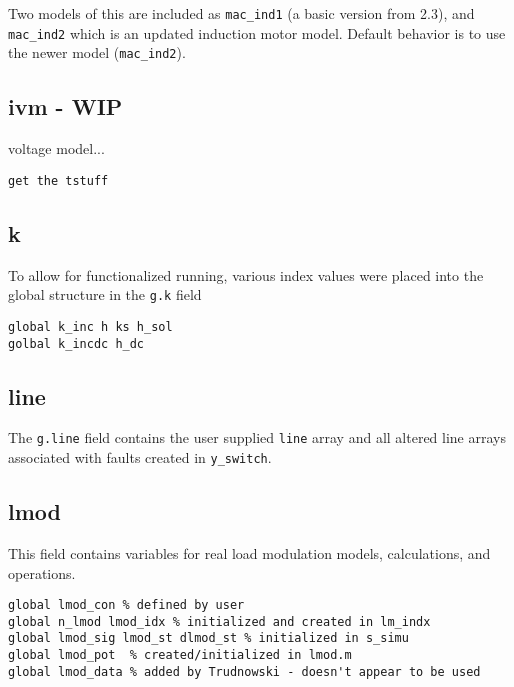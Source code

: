 Two models of this are included as \verb|mac_ind1| (a basic version from 2.3), and \verb|mac_ind2| which is an updated induction motor model. Default behavior is to use the newer model (\verb|mac_ind2|).

\subsection{ivm - WIP} 
voltage model...
\begin{verbatim}
get the tstuff
\end{verbatim}

\subsection{k}  
To allow for functionalized running, various index values were placed into the global structure in the \verb|g.k| field

\begin{verbatim}
global k_inc h ks h_sol
golbal k_incdc h_dc
\end{verbatim}

\subsection{line}  
The \verb|g.line| field contains the user supplied \verb|line| array and all altered line arrays associated with faults created in \verb|y_switch|.

\subsection{lmod}
This field contains variables for real load modulation models, calculations, and operations.
\begin{verbatim}
global lmod_con % defined by user
global n_lmod lmod_idx % initialized and created in lm_indx
global lmod_sig lmod_st dlmod_st % initialized in s_simu
global lmod_pot  % created/initialized in lmod.m 
global lmod_data % added by Trudnowski - doesn't appear to be used
\end{verbatim}

